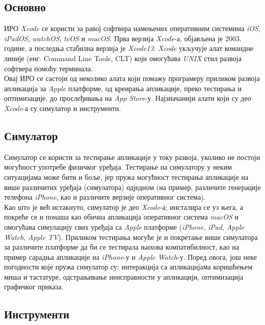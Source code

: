 \documentclass[12pt,oneside]{memoir}
\begin{document}
\subsection{Основно}

\indent ИРО \textit{Xcode} се користи за равој софтвера намењених оперативним системима \textit{iOS}, \textit{iPadOS}, \textit{watchOS}, \textit{tvOS} и \textit{macOS}. Прва верзија \textit{Xcode}-а, објављена је 2003. године, а последња стабилна верзија је \textit{Xcode13}. \textit{Xcode} укључује алат командне линије (енг. Command Line Tools, CLT) који омогућава \textit{UNIX} стил развоја софтвера помоћу терминала. 
\\
\indent Овај ИРО се састоји од неколико алата који помажу програмеру приликом развоја апликација за \textit{Apple} платформе, од креирања апликације, преко тестирања и оптимизације, до прослеђивања на \textit{App Store}-у. Најзначанији алати који су део \textit{Xcode}-а су симулатор и инструменти.

\subsection{Симулатор}
\indent Симулатор се користи за тестирање апликације у току развоја, уколико не постоји могућност употребе физичког уређаја. Тестирање на симулатору у неким ситуацијама може бити и боље, јер пружа могућност тестирања апликације на више различитих уређаја (симулатора) одједном (на пример, различите генерације телефона \textit{iPhone}, као и различите верзије оперативног система). 
\\
\indent Као што је већ истакнуто, симулатор је део \textit{Xcode}-а; инсталира се уз њега, а покреће се и понаша као обична апликација оперативног система \textit{macOS} и омогућава симулацију свих уређаја са \textit{Apple} платформе (\textit{iPhone}, \textit{iPad}, \textit{Apple Watch}, \textit{Apple TV}). Приликом тестирања могуће је и покретање више симулатора за различите платформе да би се тестирала њихова компатибилност, као на пример сарадња апликације на \textit{iPhone}-у и \textit{Apple Watch}-у. 
Поред овога, још неке погодности које пружа симулатор су: интеракција са апликацијама коришћењем миша и тастатуре, одстрањивање неисправности у апликацији, оптимизација графичког приказа.


\subsection{Инструменти}
\end{document}
